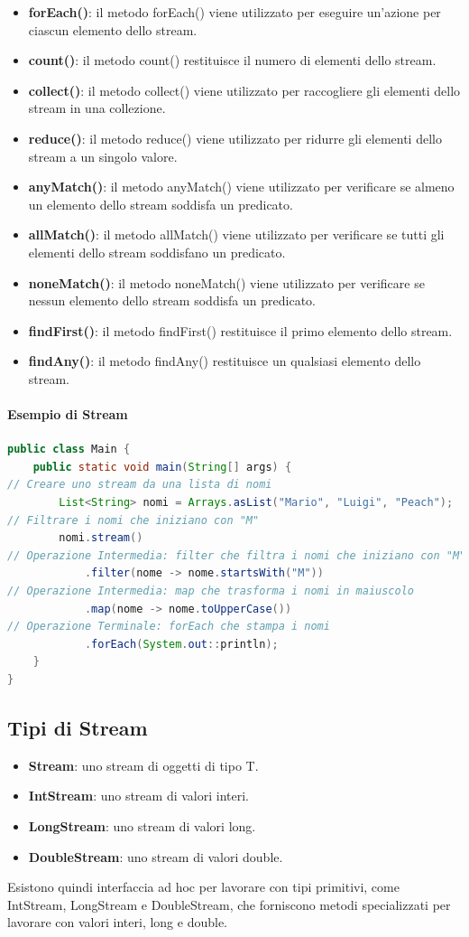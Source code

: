 \documentclass[11pt]{article}
\begin{document}
\begin{itemize}
    \item \textbf{forEach()}: il metodo forEach() viene utilizzato per eseguire un'azione per ciascun elemento dello stream.
    \item \textbf{count()}: il metodo count() restituisce il numero di elementi dello stream.
    \item \textbf{collect()}: il metodo collect() viene utilizzato per raccogliere gli elementi dello stream in una collezione.
    \item \textbf{reduce()}: il metodo reduce() viene utilizzato per ridurre gli elementi dello stream a un singolo valore.
    \item \textbf{anyMatch()}: il metodo anyMatch() viene utilizzato per verificare se almeno un elemento dello stream soddisfa un predicato.
    \item \textbf{allMatch()}: il metodo allMatch() viene utilizzato per verificare se tutti gli elementi dello stream soddisfano un predicato.
    \item \textbf{noneMatch()}: il metodo noneMatch() viene utilizzato per verificare se nessun elemento dello stream soddisfa un predicato.
    \item \textbf{findFirst()}: il metodo findFirst() restituisce il primo elemento dello stream.
    \item \textbf{findAny()}: il metodo findAny() restituisce un qualsiasi elemento dello stream.
    \end{itemize}
\paragraph{Esempio di Stream}
\begin{lstlisting}[language=Java]
public class Main {
    public static void main(String[] args) {
// Creare uno stream da una lista di nomi
        List<String> nomi = Arrays.asList("Mario", "Luigi", "Peach");
// Filtrare i nomi che iniziano con "M"
        nomi.stream()
// Operazione Intermedia: filter che filtra i nomi che iniziano con "M" usando un predicato
            .filter(nome -> nome.startsWith("M"))
// Operazione Intermedia: map che trasforma i nomi in maiuscolo
            .map(nome -> nome.toUpperCase())
// Operazione Terminale: forEach che stampa i nomi
            .forEach(System.out::println);
    }
}
\end{lstlisting}
\subsection{Tipi di Stream}
\begin{itemize}
    \item \textbf{Stream}: uno stream di oggetti di tipo T.
    \item \textbf{IntStream}: uno stream di valori interi.
    \item \textbf{LongStream}: uno stream di valori long.
    \item \textbf{DoubleStream}: uno stream di valori double.
    \end{itemize}
Esistono quindi interfaccia ad hoc per lavorare con tipi primitivi, come IntStream, LongStream e DoubleStream, che forniscono metodi specializzati per lavorare con valori interi, long e double.
\end{document}
